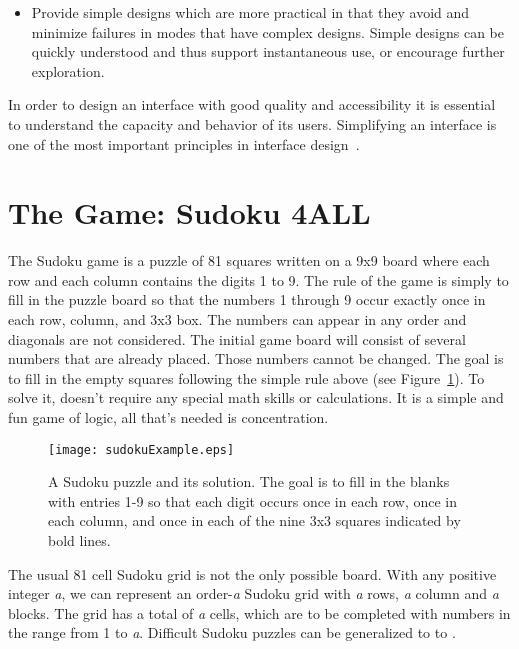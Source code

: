\documentclass[doublespace,11pt]{article}
\begin{document}
\begin{spacing}{1}
\begin{itemize}
\item Provide simple designs which are more practical in that they avoid and minimize failures in modes that have complex 
designs. Simple designs can be quickly understood and thus support instantaneous use, or encourage further exploration.
 
\end{itemize}

In order to design an interface with good quality and accessibility it is essential to understand the capacity and behavior of 
its users. Simplifying an interface is one of the most important principles in interface design~\cite{Nielsen:95,Norman:02}.
 
 
 
\section{The Game: Sudoku 4ALL}
 The Sudoku game is a puzzle of 81 squares written on a 9x9 board where each 
 row and each column contains the digits 1 to 9. 
 The rule of the game is simply to fill in the puzzle board so that the numbers 1 
 through 9 occur exactly once in each row, column, and 3x3 box. The numbers can 
 appear in any order and diagonals are not considered. The initial game board 
 will consist of several numbers that are already placed. Those numbers cannot be 
 changed. The goal is to fill in the empty squares following the simple rule above (see Figure~\ref{fig:SudokuExample}). 
 To solve it, doesn't require any special math skills or calculations. It is a simple and fun game of logic,
 all that's needed is concentration. 


\begin{figure}
\begin{center}
\texttt{[image: sudokuExample.eps]}
\end{center}
\caption{A Sudoku puzzle and its solution. The goal is to fill in the blanks with entries 
1-9 so that each digit occurs once in each row, once in each column, and once in each of 
the nine 3x3 squares indicated by bold lines.}
\label{fig:SudokuExample}
\end{figure}

The usual 81 cell Sudoku grid is not the only possible board. With any positive integer \emph{a}, 
we can represent an order-\emph{a} Sudoku grid with \emph{a} rows, \emph{a} column and \emph{a} blocks. 
The grid has a total of \emph{a} cells, which are to be completed with numbers in the range from 1 to \emph{a}. 
Difficult Sudoku puzzles can be generalized to \emph{} to \emph{}.


\end{spacing}
\end{document}
